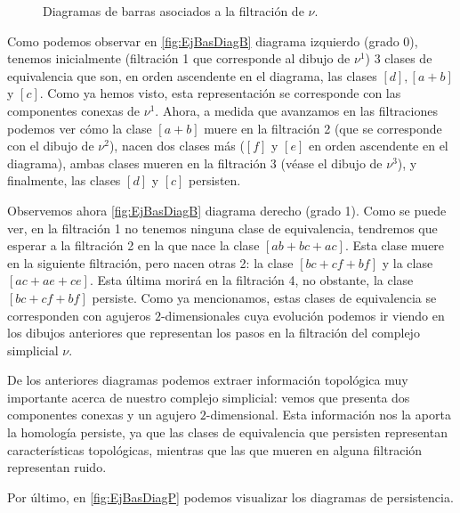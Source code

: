 \documentclass[12pt, a4paper, twoside]{book}
\numberwithin{equation}{section}
\theoremstyle{definition}
\newenvironment{ejem}
  {\pushQED{\qed}\renewcommand{\qedsymbol}{$\blacktriangleleft$}\ejemplo}
  {\popQED\endejemplo}
\theoremstyle{remark}
\theoremstyle{plain}
\begin{document}
\begin{ejem}
\begin{figure}[!htbp]
{\begin{figure}[H]
{}
			\end{figure}	
		\endminipage}
		\caption{Diagramas de barras asociados a la filtración de 
		{\Large $\nu$}.}
		\label{fig:EjBasDiagB}
	\end{figure}

	Como podemos observar en \autoref{fig:EjBasDiagB} diagrama izquierdo 
	(grado 0), 
	tenemos inicialmente (filtración 1 que corresponde al dibujo de 
	{\Large $\nu$}$^{1}$) 3 clases de equivalencia que son, en orden 
	ascendente 
	en el diagrama, las clases $[d],[a+b]$ y $[c]$. Como ya hemos visto, 
	esta representación se corresponde con las componentes conexas de 
	{\Large $\nu$}$^{1}$. Ahora, a medida que avanzamos en las 
	filtraciones podemos ver cómo la clase $[a+b]$ muere en la filtración 2
	(que se corresponde con el dibujo de {\Large $\nu$}$^{2}$), nacen dos 
	clases más ($[f]$ y $[e]$ en orden ascendente en el diagrama), ambas 
	clases mueren en la filtración 3 (véase el dibujo de 
	{\Large $\nu$}$^{3}$), y finalmente, las clases $[d]$ y $[c]$ 
	persisten.
	
	Observemos ahora \autoref{fig:EjBasDiagB} diagrama derecho (grado 1). 
	Como se puede 
	ver, en la filtración 1 no tenemos ninguna clase de equivalencia, 
	tendremos que esperar a la filtración 2 en la que nace la clase 
	$[ab+bc+ac]$. Esta clase muere en la siguiente filtración, pero nacen 
	otras 2: la clase $[bc+cf+bf]$ y la clase $[ac+ae+ce]$. Esta última 
	morirá en la filtración 4, no obstante, la clase $[bc+cf+bf]$ 
	persiste. Como ya mencionamos, estas clases de equivalencia se 
	corresponden con agujeros $2$-dimensionales cuya evolución podemos ir
	viendo en los dibujos anteriores que representan los pasos en la 
	filtración del complejo simplicial {\Large $\nu$}.

	De los anteriores diagramas podemos extraer información topológica 
	muy importante acerca de nuestro complejo simplicial: vemos que 
	presenta dos componentes conexas y un agujero $2$-dimensional. Esta 
	información nos la aporta la homología persiste, ya que las clases de 
	equivalencia que persisten representan características topológicas, 
	mientras que las que mueren en alguna filtración representan ruido.

	Por último, en \autoref{fig:EjBasDiagP} podemos visualizar los 
	diagramas de persistencia.
	\begin{figure}[!htbp]
\end{figure}
\end{ejem}
\end{document}
